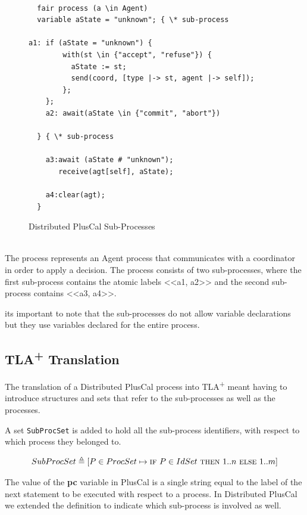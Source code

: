 \documentclass{thesul}
\newcommand{\tlaplus}{TLA\textsuperscript{+}\xspace}
\newcommand{\IF}{\textsc{if}}
\newcommand{\THEN}{\textsc{then}}
\newcommand{\ELSE}{\textsc{else}}
\begin{document}
\begin{figure}[!h]
\begin{lstlisting}[frame = tlrb, firstnumber = 1]
   
  fair process (a \in Agent)
  variable aState = "unknown"; { \* sub-process

a1: if (aState = "unknown") {
        with(st \in {"accept", "refuse"}) {
          aState := st;
          send(coord, [type |-> st, agent |-> self]);
        };
    };
    a2: await(aState \in {"commit", "abort"})
    
  } { \* sub-process
    
    a3:await (aState # "unknown");
       receive(agt[self], aState); 
       
    a4:clear(agt);
  }

\end{lstlisting}
\caption{Distributed PlusCal Sub-Processes}
\label{2pcSub}
\end{figure}

\hfill\\

The process represents an Agent process that communicates with a coordinator in order to apply a decision. The process consists of two sub-processes, where the first sub-process contains the atomic labels <<a1, a2>> and the second sub-process contains <<a3, a4>>.

its important to note that the sub-processes do not allow variable declarations but they use variables declared for the entire process.

\subsection{\tlaplus Translation}

The translation of a Distributed PlusCal process into \tlaplus meant having to introduce structures and sets that refer to the sub-processes as well as the processes.

A set \verb|SubProcSet| is added to hold all the sub-process identifiers, with respect to which process they belonged to.

\[
SubProcSet \triangleq [P \in ProcSet \mapsto \IF\ P \in IdSet\ \THEN\  1..n\ 
								\ELSE\  1..m ]
\]						  

The value of the \textbf{pc} variable in PlusCal is a single string equal to the label of the next statement to be executed with respect to a process. In Distributed PlusCal we extended the definition to indicate which sub-process is involved as well.
\end{document}
